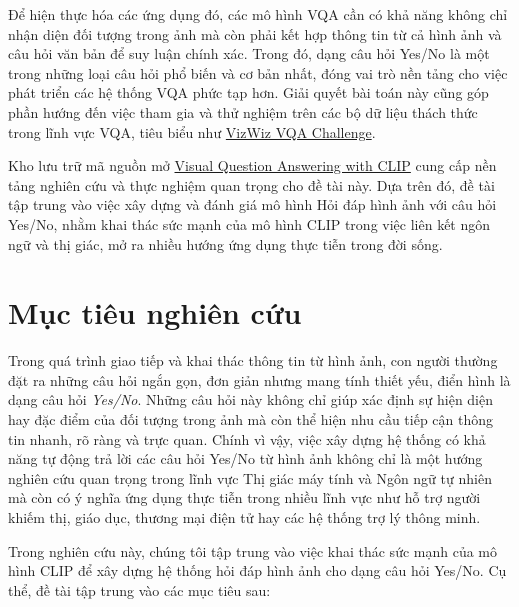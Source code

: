 Để hiện thực hóa các ứng dụng đó, các mô hình VQA cần có khả năng không chỉ nhận diện đối tượng trong ảnh mà còn phải kết hợp thông tin từ cả hình ảnh và câu hỏi văn bản để suy luận chính xác. Trong đó, dạng câu hỏi Yes/No là một trong những loại câu hỏi phổ biến và cơ bản nhất, đóng vai trò nền tảng cho việc phát triển các hệ thống VQA phức tạp hơn. Giải quyết bài toán này cũng góp phần hướng đến việc tham gia và thử nghiệm trên các bộ dữ liệu thách thức trong lĩnh vực VQA, tiêu biểu như \href{https://vizwiz.org/tasks-and-datasets/vqa/}{VizWiz VQA Challenge}.

Kho lưu trữ mã nguồn mở \href{https://github.com/yousefkotp/Visual-Question-Answering?tab=readme-ov-file}{Visual
 Question Answering with CLIP} cung cấp nền tảng nghiên cứu và thực nghiệm quan trọng cho đề tài này. Dựa trên đó, đề tài tập trung vào việc xây dựng và đánh giá mô hình Hỏi đáp hình ảnh với câu hỏi Yes/No, nhằm khai thác sức mạnh của mô hình CLIP trong việc liên kết ngôn ngữ và thị giác, mở ra nhiều hướng ứng dụng thực tiễn trong đời sống.
\section{Mục tiêu nghiên cứu}

Trong quá trình giao tiếp và khai thác thông tin từ hình ảnh, con người thường đặt ra những câu hỏi ngắn gọn, đơn giản nhưng mang tính thiết yếu, điển hình là dạng câu hỏi \textit{Yes/No}. Những câu hỏi này không chỉ giúp xác định sự hiện diện hay đặc điểm của đối tượng trong ảnh mà còn thể hiện nhu cầu tiếp cận thông tin nhanh, rõ ràng và trực quan. Chính vì vậy, việc xây dựng hệ thống có khả năng tự động trả lời các câu hỏi Yes/No từ hình ảnh không chỉ là một hướng nghiên cứu quan trọng trong lĩnh vực Thị giác máy tính và Ngôn ngữ tự nhiên mà còn có ý nghĩa ứng dụng thực tiễn trong nhiều lĩnh vực như hỗ trợ người khiếm thị, giáo dục, thương mại điện tử hay các hệ thống trợ lý thông minh.

Trong nghiên cứu này, chúng tôi tập trung vào việc khai thác sức mạnh của mô hình CLIP để xây dựng hệ thống hỏi đáp hình ảnh cho dạng câu hỏi Yes/No. Cụ thể, đề tài tập trung vào các mục tiêu sau:

